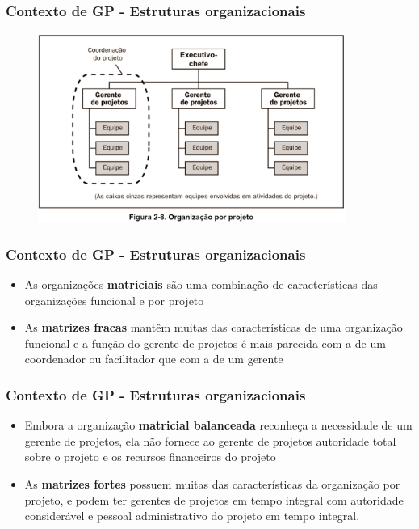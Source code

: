   
  \begin{frame}
 \frametitle{Contexto de GP - Estruturas organizacionais}
 \begin{figure}
  \centering
  \includegraphics[width = 0.9\textwidth]{figs/fig7.png}
 \end{figure}
\end{frame}

  
  \begin{frame}
   \frametitle{Contexto de GP
- Estruturas organizacionais}
   \begin{itemize}
    \item As organizações \textbf{matriciais} são uma combinação de características das organizações funcional e por projeto
    \item As \textbf{matrizes fracas} mantêm muitas das características de uma organização funcional e a função do gerente de projetos é mais parecida com a de um coordenador ou facilitador que com a de um gerente
  
   \end{itemize}
  \end{frame}
  
    \begin{frame}
   \frametitle{Contexto de GP
- Estruturas organizacionais}
   \begin{itemize}
    \item Embora a organização \textbf{matricial balanceada} reconheça a necessidade de um gerente de projetos, ela não fornece ao gerente de projetos autoridade total sobre o projeto e os recursos financeiros do projeto
    \item As \textbf{matrizes fortes} possuem muitas das características da organização por projeto, e podem ter gerentes de projetos em tempo integral com autoridade considerável e pessoal administrativo do projeto em tempo integral. 
   \end{itemize}
  \end{frame}
  
